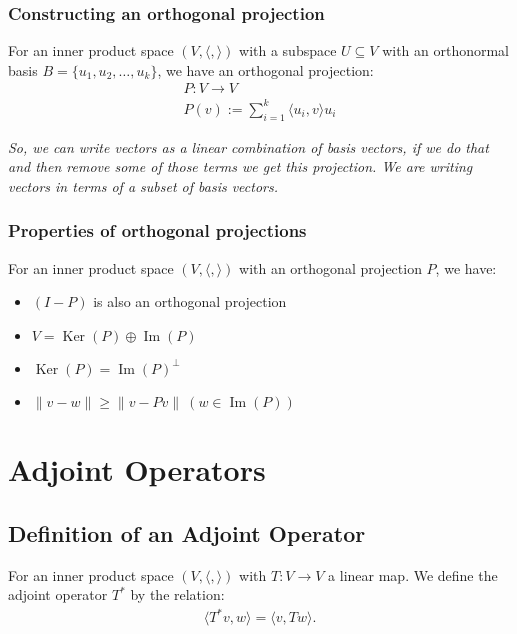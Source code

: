 \documentclass[a4paper, 12pt, twoside]{article}
\DeclareMathOperator{\Ker}{Ker}
\DeclareMathOperator{\Ima}{Im}
\begin{document}
\subsubsection{Constructing an orthogonal projection}

For an inner product space $(V, \langle , \rangle)$ with a
subspace $U \subseteq V$ with an orthonormal basis
$B = \{u_1, u_2, \ldots, u_k\}$, we have an orthogonal projection:
\begin{gather*}
  P : V \to V \\
  P(v) := \sum_{i = 1}^k \langle u_i, v \rangle u_i
\end{gather*}

\textit{So, we can write vectors as a linear combination of basis
vectors, if we do that and then remove some of those terms
we get this projection. We are writing vectors in terms of a
subset of basis vectors.}

\subsubsection{Properties of orthogonal projections}

For an inner product space $(V, \langle , \rangle)$ with an
orthogonal projection $P$, we have:
\begin{itemize}
  \item $(I - P)$ is also an orthogonal projection
  \item $V = \Ker(P) \oplus \Ima(P)$
  \item $\Ker(P) = \Ima(P)^\perp$
  \item $\|v - w\| \geq \|v - Pv\| \ (w \in \Ima(P))$
\end{itemize}

\section{Adjoint Operators}

\subsection{Definition of an Adjoint Operator}

For an inner product space $(V, \langle , \rangle)$ with 
$T : V \to V$ a linear map. We define the adjoint operator $T^*$ 
by the relation:
\begin{align*}
  \langle T^*v, w \rangle = \langle v, Tw \rangle.
\end{align*}
\end{document}

